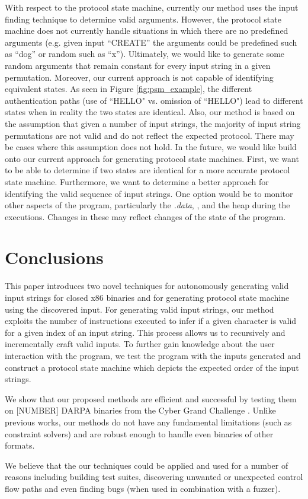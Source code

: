\documentclass{acm_proc_article-sp}
\begin{document}
With respect to the protocol state machine, currently our method uses the input finding technique to determine valid arguments.
However, the protocol state machine does not currently handle situations in which there are no predefined arguments (e.g. given input ``CREATE'' the arguments could be predefined such as ``dog'' or random such as ``x'').
Ultimately, we would like to generate some random arguments that remain constant for every input string in a given permutation.
Moreover, our current approach is not capable of identifying equivalent states. As seen in Figure \ref{fig:psm_example}, the different authentication paths (use of ``HELLO" vs. omission of ``HELLO") lead to different states when in reality the two states are identical.
Also, our method is based on the assumption that given a number of input strings, the majority of input string permutations are not valid and do not reflect the expected protocol.
There may be cases where this assumption does not hold.
In the future, we would like build onto our current approach for generating protocol state machines. 
First, we want to be able to determine if two states are identical for a more accurate protocol state machine.
Furthermore, we want to determine a better approach for identifying the valid sequence of input strings.
One option would be to monitor other aspects of the program, particularly the \textit{.data}, , and the heap during the executions.
Changes in these may reflect changes of the state of the program.


\section{Conclusions}
This paper introduces two novel techniques for autonomously generating valid input strings for closed x86 binaries and for generating protocol state machine using the discovered input.
For generating valid input strings, our method exploits the number of instructions executed to infer if a given character is valid for a given index of an input string.
This process allows us to recursively and incrementally craft valid inputs.
To further gain knowledge about the user interaction with the program, we test the program with the inputs generated and construct a protocol state machine which depicts the expected order of the input strings.

We show that our proposed methods are efficient and successful by testing them on [NUMBER] DARPA binaries from the Cyber Grand Challenge \cite{darpacgc}. 
Unlike previous works, our methods do not have any fundamental limitations (such as constraint solvers) and are robust enough to handle even binaries of other formats.

We believe that the our techniques could be applied and used for a number of reasons including building test suites, discovering unwanted or unexpected control flow paths and even finding bugs (when used in combination with a fuzzer).




\end{document}
